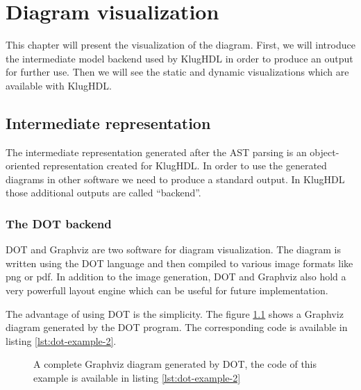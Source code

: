 \chapter{Diagram visualization}
\label{chap:diagram-visualization}

This chapter will present the visualization of the diagram. First, we will
introduce the intermediate model backend used by KlugHDL in order to produce an
output for further use. Then we will see the static and dynamic visualizations
which are available with KlugHDL.

\section{Intermediate representation}
\label{sec:intermediate-representation}

The intermediate representation generated after the AST parsing is an
object-oriented representation created for KlugHDL. In order to use the
generated diagrams in other software we need to produce a standard output. In
KlugHDL those additional outputs are called ``backend''.

\subsection{The DOT backend}
\label{sec:dot-backend}

DOT and Graphviz are two software for diagram visualization. The diagram is
written using the DOT language and then compiled to various image formats
like png or pdf. In addition to the image generation, DOT and Graphviz also hold
a very powerfull layout engine which can be useful for future implementation.

The advantage of using DOT is the simplicity. The figure \ref{fig:dot-example-2}
shows a Graphviz diagram generated by the DOT program. The corresponding code is
available in listing \ref{lst:dot-example-2}.

\begin{figure}[H]
  \centering
  \caption[Example of a Graphviz diagram]{A complete Graphviz diagram generated
    by DOT, the code of this example is available in listing \ref{lst:dot-example-2}}
  \label{fig:dot-example-2}
\end{figure}

